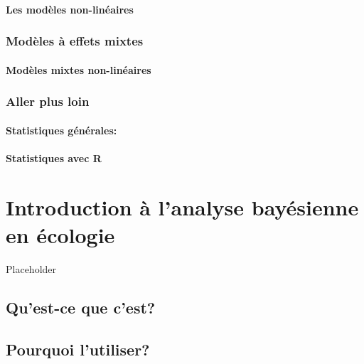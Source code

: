 \documentclass[]{book}
\begin{document}
\hypertarget{les-moduxe8les-non-linuxe9aires}{%
\subsubsection{Les modèles
non-linéaires}\label{les-moduxe8les-non-linuxe9aires}}

\hypertarget{moduxe8les-uxe0-effets-mixtes}{%
\subsection{Modèles à effets
mixtes}\label{moduxe8les-uxe0-effets-mixtes}}

\hypertarget{moduxe8les-mixtes-non-linuxe9aires}{%
\subsubsection{Modèles mixtes
non-linéaires}\label{moduxe8les-mixtes-non-linuxe9aires}}

\hypertarget{aller-plus-loin}{%
\subsection{Aller plus loin}\label{aller-plus-loin}}

\hypertarget{statistiques-guxe9nuxe9rales}{%
\subsubsection{Statistiques
générales:}\label{statistiques-guxe9nuxe9rales}}

\hypertarget{statistiques-avec-r}{%
\subsubsection{Statistiques avec R}\label{statistiques-avec-r}}

\hypertarget{chapitre-biostats-bayes}{%
\chapter{Introduction à l'analyse bayésienne en
écologie}\label{chapitre-biostats-bayes}}

Placeholder

\hypertarget{quest-ce-que-cest}{%
\section{Qu'est-ce que c'est?}\label{quest-ce-que-cest}}

\hypertarget{pourquoi-lutiliser}{%
\section{Pourquoi l'utiliser?}\label{pourquoi-lutiliser}}
\end{document}
